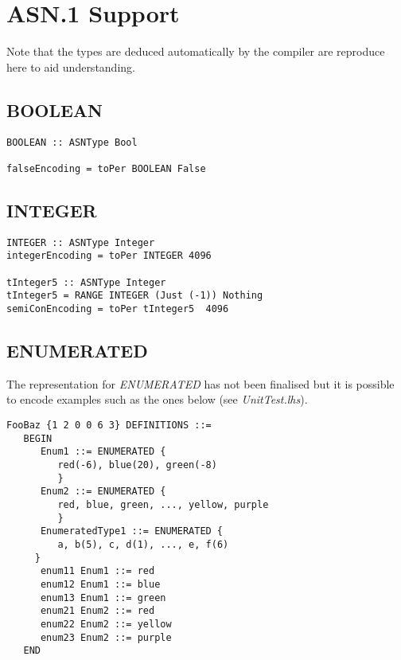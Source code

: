 \documentclass{article}
\begin{document}
\section{ASN.1 Support}

Note that the types are deduced automatically by the compiler are 
reproduce here to aid understanding.

\subsection{BOOLEAN}

\lstset{language=Haskell}

\begin{lstlisting}[frame=single]
BOOLEAN :: ASNType Bool

falseEncoding = toPer BOOLEAN False
\end{lstlisting}

\subsection{INTEGER}

\begin{lstlisting}[frame=single]
INTEGER :: ASNType Integer
integerEncoding = toPer INTEGER 4096

tInteger5 :: ASNType Integer
tInteger5 = RANGE INTEGER (Just (-1)) Nothing
semiConEncoding = toPer tInteger5  4096
\end{lstlisting}

\subsection{ENUMERATED}

The representation for {\em ENUMERATED} has not been finalised but it is
possible to encode examples such as the ones below (see {\em UnitTest.lhs}).

\begin{lstlisting}[frame=single]
FooBaz {1 2 0 0 6 3} DEFINITIONS ::=
   BEGIN
      Enum1 ::= ENUMERATED {
         red(-6), blue(20), green(-8)
         }
      Enum2 ::= ENUMERATED {
         red, blue, green, ..., yellow, purple
         }
      EnumeratedType1 ::= ENUMERATED {
         a, b(5), c, d(1), ..., e, f(6)
	 }
      enum11 Enum1 ::= red
      enum12 Enum1 ::= blue
      enum13 Enum1 ::= green
      enum21 Enum2 ::= red
      enum22 Enum2 ::= yellow
      enum23 Enum2 ::= purple
   END
\end{lstlisting}
\end{document}
